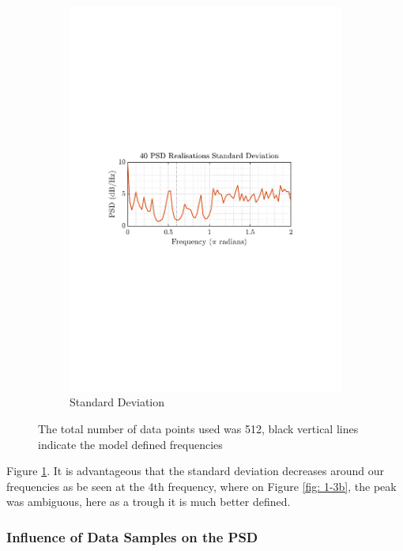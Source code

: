 \documentclass[12pt]{article}
\numberwithin{equation}{section}
\begin{document}
\begin{figure}[H]
\begin{subfigure}{0.49\textwidth}
			\includegraphics[trim={2.2cm 11.2cm 3.15cm  11.2cm}, clip, width=\textwidth]{../MATLAB/figures/q1_3c_fig02.pdf} 
			\captionsetup{justification=centering}
			\caption{Standard Deviation}
		\end{subfigure}
		\captionsetup{justification=centering}
		\caption{The total number of data points used was 512, black vertical lines indicate the model defined frequencies}
		\label{fig: 1-3c}
	\end{figure}

	Figure \ref{fig: 1-3c}. It is advantageous that the standard deviation decreases around our frequencies as be seen at the 4th frequency, where on Figure \ref{fig: 1-3b}, the peak was ambiguous, here as a trough it is much better defined.

	\subsubsection{Influence of Data Samples on the PSD}
	
\end{document}
